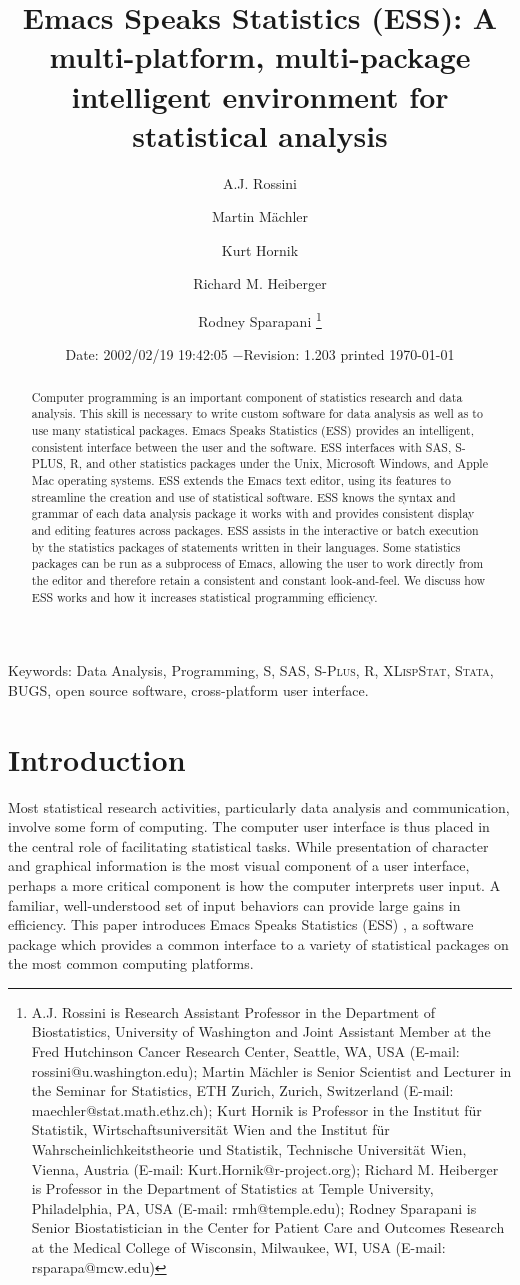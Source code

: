 \documentclass{article}
\title{Emacs Speaks Statistics (ESS): A multi-platform, multi-package
intelligent environment for statistical analysis}
\author{A.J. Rossini \and Martin M{\"a}chler \and Kurt Hornik \and Richard
  M. Heiberger \and Rodney Sparapani \footnote{%
    A.J. Rossini is Research Assistant Professor in the Department of
    Biostatistics, University of Washington and Joint Assistant Member at
    the Fred Hutchinson Cancer Research Center, Seattle, WA, USA
    (E-mail: rossini@u.washington.edu);
    Martin M{\"a}chler is Senior Scientist and Lecturer in the Seminar for
    Statistics, ETH Zurich, Zurich, Switzerland
    (E-mail: maechler@stat.math.ethz.ch);
    Kurt Hornik is Professor in the Institut f{\"u}r Statistik,
    Wirtschaftsuniversit{\"a}t Wien and the Institut f{\"u}r
    Wahrscheinlichkeitstheorie und Statistik, Technische Universit{\"a}t
    Wien, Vienna, Austria (E-mail: Kurt.Hornik@r-project.org);
    Richard M. Heiberger is Professor in the Department of Statistics at
    Temple University, Philadelphia, PA, USA (E-mail: rmh@temple.edu);
    Rodney Sparapani is Senior Biostatistician in the Center for Patient
    Care and Outcomes Research at the Medical College of Wisconsin, 
    Milwaukee, WI, USA (E-mail: rsparapa@mcw.edu)}}
\date{$ $Date: 2002/02/19 19:42:05 $ - $Revision: 1.203 $ $\tiny printed \today}
\newif\ifdraft
\renewcommand{\baselinestretch}{1.5}
\newcommand*{\SAS}{\textsc{SAS}}
\newcommand*{\Splus}{\textsc{S-Plus}}
\newcommand*{\XLispStat}{\textsc{XLispStat}}
\newcommand*{\Stata}{\textsc{Stata}}
\begin{document}

\ifdraft
\setcounter{page}{0}
\tableofcontents
\fi

\maketitle

\ifdraft{}%
\else%
 \renewcommand{\baselinestretch}{1.5}
\fi

\begin{abstract}
  Computer programming is an important component of statistics
  research and data analysis.  This skill is necessary to write custom
  software for data analysis as well as to use many statistical
  packages.  Emacs Speaks Statistics (ESS) provides an intelligent,
  consistent interface between the user and the software.  ESS
  interfaces with SAS, S-PLUS, R, and other statistics packages under
  the Unix, Microsoft Windows, and Apple Mac operating systems.  ESS
  extends the Emacs text editor, using its features to streamline the
  creation and use of statistical software.  ESS knows the syntax and
  grammar of each data analysis package it works with and provides
  consistent display and editing features across packages.  ESS
  assists in the interactive or batch execution by the statistics
  packages of statements written in their languages.  Some statistics
  packages can be run as a subprocess of Emacs, allowing the user to
  work directly from the editor and therefore retain a consistent and
  constant look-and-feel.  We discuss how ESS works and how it
  increases statistical programming efficiency.
\end{abstract}

\noindent Keywords: Data Analysis, Programming, 
S, \SAS, \Splus, R, \XLispStat, \Stata, BUGS, open source software,
cross-platform user interface.

\section{Introduction}
\label{sec:introduction}

Most statistical research activities, particularly data analysis and
communication, involve some form of computing.  The computer user
interface is thus placed in the central role of facilitating
statistical tasks.  While presentation of character and graphical
information is the most visual component of a user interface,
perhaps a more critical component is how the computer interprets user
input.  A familiar, well-understood set of input behaviors can provide
large gains in efficiency.  This paper introduces Emacs Speaks
Statistics (ESS) \citep{ESS}, a software package which provides a
common interface to a variety of statistical packages on the most
common computing platforms.
\end{document}

